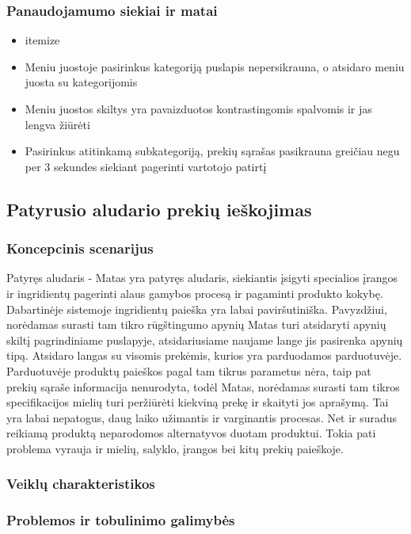 \documentclass[oneside]{VUMIFPSkursinis}
\begin{document}
		\subsubsection{Panaudojamumo siekiai ir matai}
			\begin{itemize}
				\item{itemize}
				\item{Meniu juostoje pasirinkus kategoriją puslapis nepersikrauna, o atsidaro meniu juosta su kategorijomis}
				\item{Meniu juostos skiltys yra pavaizduotos kontrastingomis spalvomis ir jas lengva žiūrėti}
				\item{Pasirinkus atitinkamą subkategoriją, prekių sąrašas pasikrauna greičiau negu per 3 sekundes siekiant pagerinti vartotojo patirtį}
			\end{itemize}
	\subsection{Patyrusio aludario prekių ieškojimas}
		\subsubsection{Koncepcinis scenarijus}
			Patyręs aludaris - Matas yra patyręs aludaris, siekiantis įsigyti specialios įrangos ir ingridientų pagerinti alaus gamybos procesą ir pagaminti produkto kokybę.
			Dabartinėje sistemoje ingridientų paieška yra labai paviršutiniška.
			Pavyzdžiui, norėdamas surasti tam tikro rūgštingumo apynių Matas turi atsidaryti apynių skiltį pagrindiniame puslapyje, atsidariusiame naujame lange jis pasirenka apynių tipą.
			Atsidaro langas su visomis prekėmis, kurios yra parduodamos parduotuvėje.
			Parduotuvėje produktų paieškos pagal tam tikrus parametus nėra, taip pat prekių sąraše informacija nenurodyta, todėl Matas, norėdamas surasti tam tikros specifikacijos mielių turi peržiūrėti kiekviną prekę ir skaityti jos aprašymą.
			Tai yra labai nepatogus, daug laiko užimantis ir varginantis procesas.
			Net ir suradus reikiamą produktą neparodomos alternatyvos duotam produktui.
			Tokia pati problema vyrauja ir mielių, salyklo, įrangos bei kitų prekių paieškoje.
		\subsubsection{Veiklų charakteristikos}
		\subsubsection{Problemos ir tobulinimo galimybės}
\end{document}
